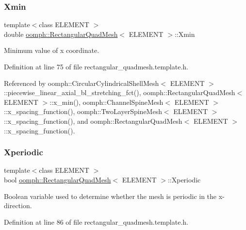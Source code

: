 \subsubsection{\texorpdfstring{Xmin}{Xmin}}
{\footnotesize\ttfamily template$<$class E\+L\+E\+M\+E\+NT $>$ \\
double \hyperlink{classoomph_1_1RectangularQuadMesh}{oomph\+::\+Rectangular\+Quad\+Mesh}$<$ E\+L\+E\+M\+E\+NT $>$\+::Xmin\hspace{0.3cm}{\ttfamily [protected]}}



Minimum value of x coordinate. 



Definition at line 75 of file rectangular\+\_\+quadmesh.\+template.\+h.



Referenced by oomph\+::\+Circular\+Cylindrical\+Shell\+Mesh$<$ E\+L\+E\+M\+E\+N\+T $>$\+::piecewise\+\_\+linear\+\_\+axial\+\_\+bl\+\_\+stretching\+\_\+fct(), oomph\+::\+Rectangular\+Quad\+Mesh$<$ E\+L\+E\+M\+E\+N\+T $>$\+::x\+\_\+min(), oomph\+::\+Channel\+Spine\+Mesh$<$ E\+L\+E\+M\+E\+N\+T $>$\+::x\+\_\+spacing\+\_\+function(), oomph\+::\+Two\+Layer\+Spine\+Mesh$<$ E\+L\+E\+M\+E\+N\+T $>$\+::x\+\_\+spacing\+\_\+function(), and oomph\+::\+Rectangular\+Quad\+Mesh$<$ E\+L\+E\+M\+E\+N\+T $>$\+::x\+\_\+spacing\+\_\+function().

\mbox{\label{classoomph_1_1RectangularQuadMesh_a83dd0ace2eb47449f5e30522f71d9f59}} 
\subsubsection{\texorpdfstring{Xperiodic}{Xperiodic}}
{\footnotesize\ttfamily template$<$class E\+L\+E\+M\+E\+NT $>$ \\
bool \hyperlink{classoomph_1_1RectangularQuadMesh}{oomph\+::\+Rectangular\+Quad\+Mesh}$<$ E\+L\+E\+M\+E\+NT $>$\+::Xperiodic\hspace{0.3cm}{\ttfamily [protected]}}



Boolean variable used to determine whether the mesh is periodic in the x-\/direction. 



Definition at line 86 of file rectangular\+\_\+quadmesh.\+template.\+h.



